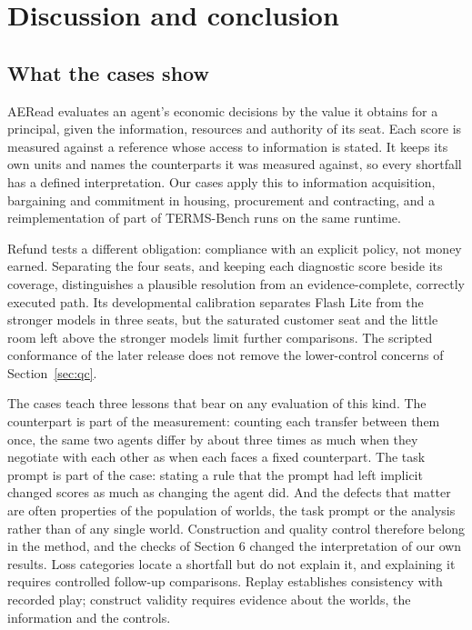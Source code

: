 \section{Discussion and conclusion}
\label{sec:discussion}

\subsection{What the cases show}
\label{sec:discussion-findings}

AERead evaluates an agent's economic decisions by the value it obtains for
a principal, given the information, resources and authority of its seat.
Each score is measured against a reference whose access to information is
stated. It keeps its own units and names the counterparts it was measured
against, so every shortfall has a defined interpretation. Our cases apply
this to information acquisition, bargaining and commitment in housing,
procurement and contracting, and a reimplementation of part of TERMS-Bench
runs on the same runtime.

Refund tests a different obligation: compliance with an explicit policy,
not money earned. Separating the four seats, and keeping each diagnostic
score beside its coverage, distinguishes a plausible resolution from an
evidence-complete, correctly executed path. Its developmental calibration
separates Flash Lite from the stronger models in three seats, but the
saturated customer seat and the little room left above the stronger models
limit further comparisons. The scripted conformance of the later release
does not remove the lower-control concerns of Section~\ref{sec:qc}.

The cases teach three lessons that bear on any evaluation of this kind.
The counterpart is part of the measurement: counting each transfer between
them once, the same two agents differ by about three times as much when they
negotiate with each other as when each faces a fixed counterpart. The task prompt is part of the case: stating a rule that the prompt had left
implicit changed scores as much as changing the agent did. And the defects
that matter are often properties of the population of worlds, the task prompt or
the analysis rather than of any single world. Construction and quality
control therefore belong in the method, and the checks of Section 6 changed
the interpretation of our own results. Loss categories locate a shortfall
but do not explain it, and explaining it requires controlled follow-up
comparisons. Replay establishes consistency with recorded play; construct
validity requires evidence about the worlds, the information and the
controls.

